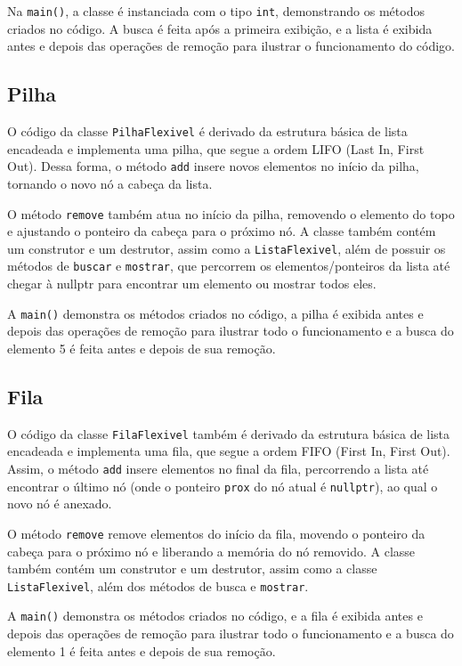 \documentclass[12pt]{article}
\begin{document}
Na \texttt{main()}, a classe é instanciada com o tipo \texttt{int}, demonstrando os métodos criados no código. A busca é feita após a primeira exibição, e a lista é exibida antes e depois das operações de remoção para ilustrar o funcionamento do código.


\subsection{Pilha}

O código da classe \texttt{PilhaFlexivel} é derivado da estrutura básica de lista encadeada e implementa uma pilha, que segue a ordem LIFO (Last In, First Out). Dessa forma, o método \texttt{add} insere novos elementos no início da pilha, tornando o novo nó a cabeça da lista. 

O método \texttt{remove} também atua no início da pilha, removendo o elemento do topo e ajustando o ponteiro da cabeça para o próximo nó. A classe também contém um construtor e um destrutor, assim como a \texttt{ListaFlexivel}, além de possuir os métodos de \texttt{buscar} e \texttt{mostrar}, que percorrem os elementos/ponteiros da lista até chegar à nullptr para encontrar um elemento ou mostrar todos eles.

A \texttt{main()} demonstra os métodos criados no código, a pilha é exibida antes e depois das operações de remoção para ilustrar todo o funcionamento e a busca do elemento 5 é feita antes e depois de sua remoção.

\subsection{Fila}
O código da classe \texttt{FilaFlexivel} também é derivado da estrutura básica de lista encadeada e implementa uma fila, que segue a ordem FIFO (First In, First Out). Assim, o método \texttt{add} insere elementos no final da fila, percorrendo a lista até encontrar o último nó (onde o ponteiro \texttt{prox} do nó atual é \texttt{nullptr}), ao qual o novo nó é anexado. 

O método \texttt{remove} remove elementos do início da fila, movendo o ponteiro da cabeça para o próximo nó e liberando a memória do nó removido. A classe também contém um construtor e um destrutor, assim como a classe \texttt{ListaFlexivel}, além dos métodos de busca e \texttt{mostrar}.

A \texttt{main()} demonstra os métodos criados no código, e a fila é exibida antes e depois das operações de remoção para ilustrar todo o funcionamento e a busca do elemento 1 é feita antes e depois de sua remoção.
\end{document}
